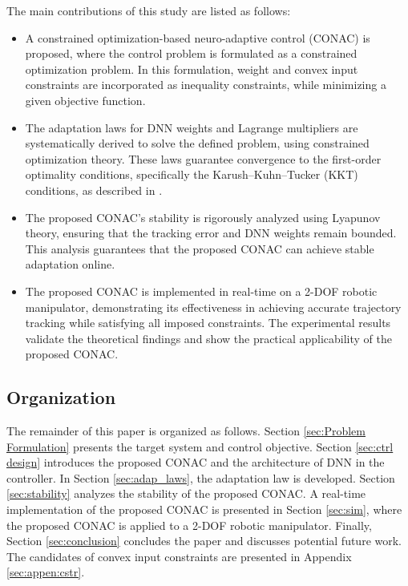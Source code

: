 \documentclass[journal]{IEEEtran}
\begin{document}
The main contributions of this study are listed as follows:
\begin{itemize}
    \item A constrained optimization-based neuro-adaptive control (CONAC) is proposed, where the control problem is formulated as a constrained optimization problem. In this formulation, weight and convex input constraints are incorporated as inequality constraints, while minimizing a given objective function.
    \item The adaptation laws for DNN weights and Lagrange multipliers are systematically derived to solve the defined problem, using constrained optimization theory. These laws guarantee convergence to the first-order optimality conditions, specifically the Karush–Kuhn–Tucker (KKT) conditions, as described in \cite[Chap. 12, Thm. 12.1]{Nocedal:2006aa}.
    \item The proposed CONAC's stability is rigorously analyzed using Lyapunov theory, ensuring that the tracking error and DNN weights remain bounded. This analysis guarantees that the proposed CONAC can achieve stable adaptation online.
    \item The proposed CONAC is implemented in real-time on a 2-DOF robotic manipulator, demonstrating its effectiveness in achieving accurate trajectory tracking while satisfying all imposed constraints. The experimental results validate the theoretical findings and show the practical applicability of the proposed CONAC.
\end{itemize}

\subsection{Organization}

The remainder of this paper is organized as follows. 
Section \ref{sec:Problem Formulation} presents the target system and control objective.
Section \ref{sec:ctrl design} introduces the proposed CONAC and the architecture of DNN in the controller. 
In Section \ref{sec:adap_laws}, the adaptation law is developed.
Section \ref{sec:stability} analyzes the stability of the proposed CONAC.
A real-time implementation of the proposed CONAC is presented in Section \ref{sec:sim}, where the proposed CONAC is applied to a 2-DOF robotic manipulator.
Finally, Section \ref{sec:conclusion} concludes the paper and discusses potential future work.
The candidates of convex input constraints are presented in Appendix \ref{sec:appen:cstr}. 
\end{document}
